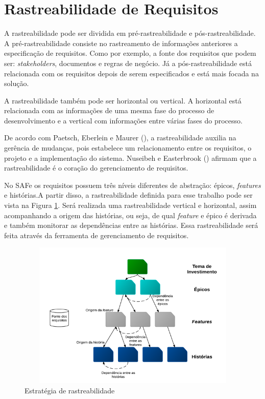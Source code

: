 \section[Rastreabilidade de Requisitos]{Rastreabilidade de Requisitos}

A rastreabilidade pode ser dividida em pré-rastreabilidade e pós-rastreabilidade. 
A pré-rastreabilidade consiste no rastreamento de informações anteriores a especificação
de requisitos. Como por exemplo, a fonte dos requisitos que podem ser: \textit{stakeholders},
documentos e regras de negócio. Já a pós-rastreabilidade está relacionada com os requisitos depois 
de serem especificados e está mais focada na solução. \cite{persson}

A rastreabilidade também pode ser horizontal ou vertical. A horizontal está relacionada com
as informações de uma mesma fase do processo de desenvolvimento e a vertical
com informações entre várias fases do processo. \cite{persson}

De acordo com Paetsch, Eberlein e Maurer (\citeyear{paetsch}), a rastreabilidade auxilia na gerência de mudanças, 
pois estabelece um relacionamento entre os requisitos, o projeto e a implementação do sistema. Nuseibeh e Easterbrook (\citeyear{nuseibeh})
afirmam que a rastreabilidade é o coração do gerenciamento de requisitos.

No SAFe os requisitos possuem três níveis diferentes de abstração: épicos, \textit{features} e histórias.A partir disso, a rastreabilidade 
definida para esse trabalho pode ser vista na Figura \ref{Rotulo}. Será realizada uma rastreabilidade vertical e horizontal, assim acompanhando
a origem das histórias, ou seja, de qual \textit{feature} e épico é derivada e também monitorar as dependências entre as histórias. 
Essa rastreabilidade será feita através da ferramenta de gerenciamento de requisitos.

\graphicspath{{figuras/}}

\begin{figure}[!htb]
 \centering
 \includegraphics[width = 13cm, height = 7cm]{rastreabilidade}
 \caption{Estratégia de rastreabilidade}
 \label{Rotulo}

\end{figure}